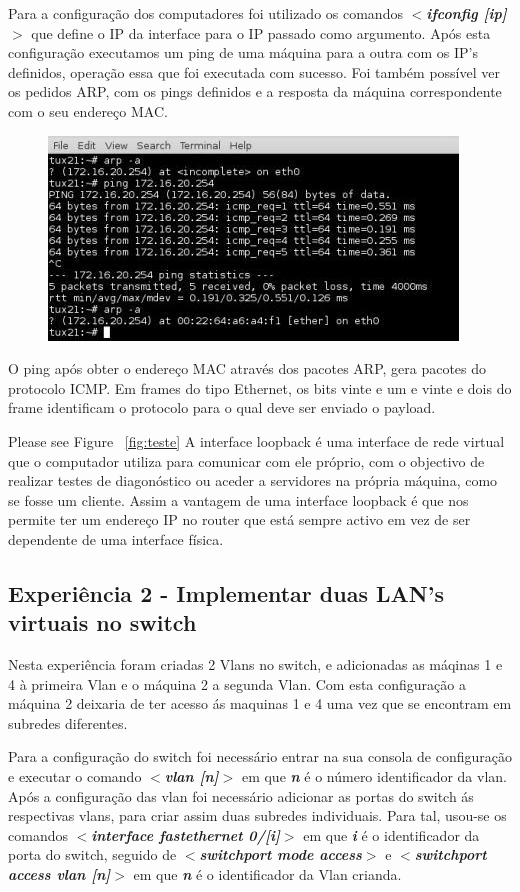 \documentclass[a4paper]{article}
\begin{document}
Para a configuração dos computadores foi utilizado os comandos \textbf{\textit{$<$ifconfig [ip]$>$}} que define o IP da interface para o IP passado como argumento. Após esta configuração executamos um ping de uma máquina para a outra com os IP’s definidos, operação essa que foi executada com sucesso. Foi também possível ver os pedidos ARP, com os pings definidos e a resposta da máquina correspondente com o seu endereço MAC.

\begin{figure}[h!]
\centering
\includegraphics[scale=0.5]{res/image1.jpg}
\end{figure}

O ping após obter o endereço MAC através dos pacotes ARP, gera pacotes do protocolo ICMP. Em frames do tipo Ethernet, os bits vinte e um e vinte e dois do frame identificam o protocolo para o qual deve ser enviado o payload.

\pagebreak

Please see Figure ~\autoref{fig:teste}
A interface loopback é uma interface de rede virtual que o computador utiliza para comunicar com ele próprio, com o objectivo de realizar testes de diagonóstico ou aceder a servidores na própria máquina, como se fosse um cliente. Assim a vantagem de uma interface loopback é que nos permite ter um endereço IP no router que está sempre activo em vez de ser dependente de uma interface física.

\subsection{Experiência 2 - Implementar duas LAN's virtuais no switch}
Nesta experiência foram criadas 2 Vlans no switch, e adicionadas as máqinas 1 e 4 à primeira Vlan e o máquina 2 a segunda Vlan. Com esta configuração a máquina 2 deixaria de ter acesso ás maquinas 1 e 4 uma vez que se encontram em subredes diferentes.


Para a configuração do switch foi necessário entrar na sua consola de configuração e executar o comando \textbf{\textit{$<$vlan [n]$>$}} em que \textbf{\textit{n}} é o número identificador da vlan. Após a configuração das vlan foi necessário adicionar as portas do switch ás respectivas vlans, para criar assim duas subredes individuais. Para tal, usou-se os comandos \textbf{\textit{$<$interface fastethernet 0/[i]$>$}} em que \textbf{\textit{i}} é o identificador da porta do switch, seguido de \textbf{\textit{$<$switchport mode access$>$}} e \textbf{\textit{$<$switchport access vlan [n]$>$}} em que \textit{\textbf{n}} é o identificador da Vlan crianda.
\end{document}
